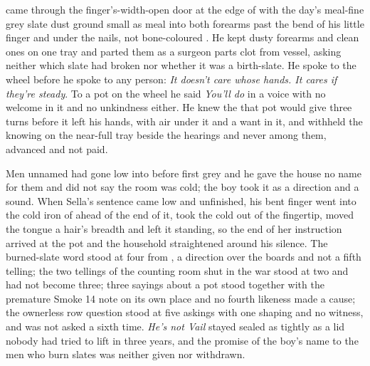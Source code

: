 \scenebreak

 came through the finger's-width-open door at the edge of  with the day's meal-fine grey slate dust ground small as meal into both forearms past the bend of his little finger and under the nails, not bone-coloured . He kept dusty forearms and clean ones on one tray and parted them as a surgeon parts clot from vessel, asking neither which slate had broken nor whether it was a birth-slate. He spoke to the wheel before he spoke to any person: \emph{It doesn't care whose hands. It cares if they're steady}. To a pot on the wheel he said \emph{You'll do} in a voice with no welcome in it and no unkindness either. He knew the  that pot would give three turns before it left his hands, with air under it and a want in it, and withheld the knowing on the near-full tray beside the hearings and never among them, advanced and not paid.

Men unnamed had gone low into  before first grey and he gave the house no name for them and did not say the room was cold; the boy took it as a direction and a sound. When Sella's sentence came low and unfinished, his bent finger went into the cold iron of  ahead of the end of it, took the cold out of the fingertip, moved the tongue a hair's breadth and left it standing, so the end of her instruction arrived at the pot and the household straightened around his silence. The burned-slate word stood at four from , a direction over the boards and not a fifth telling; the two tellings of the counting room shut in the war stood at two and had not become three; three sayings about a pot stood together with the premature Smoke 14 note on its own place and no fourth likeness made a cause; the ownerless row question stood at five askings with one shaping and no witness, and was not asked a sixth time. \emph{He's not Vail} stayed sealed as tightly as a lid nobody had tried to lift in three years, and the promise of the boy's name to the men who burn slates was neither given nor withdrawn.

\scenebreak

